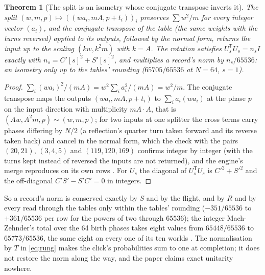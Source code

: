 \documentclass[11pt]{article}
\newtheorem{theorem}{Theorem}
\theoremstyle{definition}
\begin{document}
\begin{theorem}[The split is an isometry whose conjugate transpose inverts it]\label{th:isometry}
The split $(w, m, p) \mapsto ((wa_i, mA, p + t_i))_i$ preserves
$\sum w^2/m$ for every integer vector $(a_i)$, and the conjugate
transpose of the table (the same weights with the turns reversed)
applied to its outputs, followed by the normal form, returns the input up
to the scaling $(kw, k^2m)$ with $k = A$. The rotation satisfies
$U_s^{\mathsf T} U_s = n_s I$ exactly with $n_s = C'[s]^2 + S'[s]^2$, and
multiplies a record's norm by $n_s/65536$: an isometry only up to the
tables' rounding ($65705/65536$ at $N = 64$, $s = 1$).
\end{theorem}
\begin{proof}
$\sum_i (wa_i)^2/(mA) = w^2 \sum_i a_i^2/(mA) = w^2/m$. The conjugate
transpose maps the outputs $(wa_i, mA, p + t_i)$ to $\sum_i a_i (w a_i)$
at the phase $p$ on the input direction with multiplicity $mA \cdot A$,
that is $(Aw, A^2 m, p) \sim (w, m, p)$; for two inputs at one splitter
the cross terms carry phases differing by $N/2$ (a reflection's quarter
turn taken forward and its reverse taken back) and cancel in the normal
form, which the check with the pairs $(20, 21)$, $(3, 4, 5)$ and
$(119, 120, 169)$ confirms integer by integer \cite{design} (with the
turns kept instead of reversed the inputs are not returned), and the
engine's merge reproduces on its own rows \cite{beamlaw}. For $U_s$ the
diagonal of $U_s^{\mathsf T}U_s$ is $C'^2 + S'^2$ and the off-diagonal
$C'S' - S'C' = 0$ in integers.
\end{proof}

So a record's norm is conserved exactly by $S$ and by the flight, and by
$R$ and by every read through the tables only within the tables' rounding
($-351/65536$ to $+361/65536$ per row for the powers of two through
$65536$); the integer
Mach-Zehnder's total over the 64 birth phases takes eight values from
$65448/65536$ to $65773/65536$, the same eight on every one of its ten
worlds \cite{register}. The normalisation by $T$ in \eqref{eq:rung} makes
the click's probabilities sum to one at completion; it does not restore
the norm along the way, and the paper claims exact unitarity nowhere.
\end{document}
